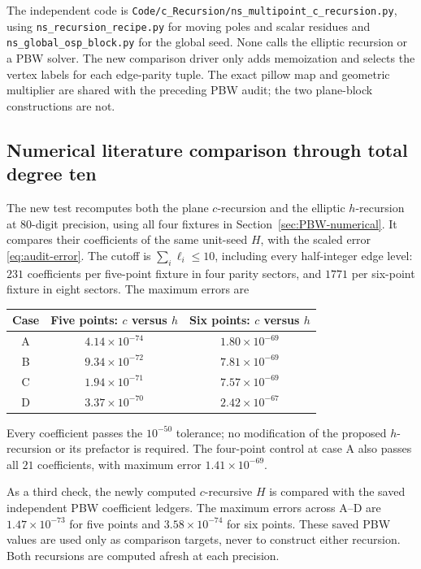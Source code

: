 \documentclass[11pt]{article}
\numberwithin{equation}{section}
\begin{document}
The independent code is
\nolinkurl{Code/c_Recursion/ns_multipoint_c_recursion.py}, using
\nolinkurl{ns_recursion_recipe.py} for moving poles and scalar residues
and \nolinkurl{ns_global_osp_block.py} for the global seed. None calls
the elliptic recursion or a PBW solver. The new comparison driver only
adds memoization and selects the vertex labels for each edge-parity
tuple. The exact pillow map and geometric multiplier are shared with
the preceding PBW audit; the two plane-block constructions are not.

\subsection{Numerical literature comparison through total degree ten}
\label{sec:c-numerical}

The new test recomputes both the plane $c$-recursion and the elliptic
$h$-recursion at 80-digit precision, using all four fixtures in
Section~\ref{sec:PBW-numerical}. It compares their coefficients of the
same unit-seed $H$, with the scaled error \eqref{eq:audit-error}.
The cutoff is $\sum_i\ell_i\leq10$, including every half-integer edge
level: $231$ coefficients per five-point fixture in four parity sectors,
and $1771$ per six-point fixture in eight sectors. The maximum errors are
\begin{center}
\begin{tabular}{@{}ccc@{}}
\toprule
Case & Five points: $c$ versus $h$ & Six points: $c$ versus $h$\\
\midrule
A & $4.14\times10^{-74}$ & $1.80\times10^{-69}$\\
B & $9.34\times10^{-72}$ & $7.81\times10^{-69}$\\
C & $1.94\times10^{-71}$ & $7.57\times10^{-69}$\\
D & $3.37\times10^{-70}$ & $2.42\times10^{-67}$\\
\bottomrule
\end{tabular}
\end{center}
Every coefficient passes the $10^{-50}$ tolerance; no modification of
the proposed $h$-recursion or its prefactor is required. The four-point
control at case A also passes all $21$ coefficients, with maximum error
$1.41\times10^{-69}$.

As a third check, the newly computed $c$-recursive $H$ is compared with
the saved independent PBW coefficient ledgers. The maximum errors across
A--D are $1.47\times10^{-73}$ for five points and
$3.58\times10^{-74}$ for six points. These saved PBW values are used
only as comparison targets, never to construct either recursion.
Both recursions are computed afresh at each precision.
\end{document}
